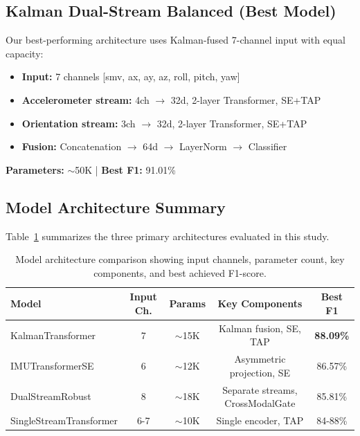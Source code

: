 \documentclass{article}
\begin{document}
\subsection{Kalman Dual-Stream Balanced (Best Model)}

Our best-performing architecture uses Kalman-fused 7-channel input with equal capacity:

\begin{itemize}
    \item \textbf{Input:} 7 channels [smv, ax, ay, az, roll, pitch, yaw]
    \item \textbf{Accelerometer stream:} 4ch $\rightarrow$ 32d, 2-layer Transformer, SE+TAP
    \item \textbf{Orientation stream:} 3ch $\rightarrow$ 32d, 2-layer Transformer, SE+TAP
    \item \textbf{Fusion:} Concatenation $\rightarrow$ 64d $\rightarrow$ LayerNorm $\rightarrow$ Classifier
\end{itemize}

\textbf{Parameters:} $\sim$50K | \textbf{Best F1:} 91.01\%

\subsection{Model Architecture Summary}

Table~\ref{tab:arch_comparison} summarizes the three primary architectures evaluated in this study.

\begin{table}[htbp]
    \centering
    \caption{Model architecture comparison showing input channels, parameter count, key components, and best achieved F1-score.}
    \label{tab:arch_comparison}
    \small
    \begin{tabular}{lcccc}
        \toprule
        \textbf{Model} & \textbf{Input Ch.} & \textbf{Params} & \textbf{Key Components} & \textbf{Best F1} \\
        \midrule
        KalmanTransformer & 7 & $\sim$15K & Kalman fusion, SE, TAP & \textbf{88.09\%} \\
        IMUTransformerSE & 6 & $\sim$12K & Asymmetric projection, SE & 86.57\% \\
        DualStreamRobust & 8 & $\sim$18K & Separate streams, CrossModalGate & 85.81\% \\
        SingleStreamTransformer & 6-7 & $\sim$10K & Single encoder, TAP & 84-88\% \\
        \bottomrule
    \end{tabular}
\end{table}
\end{document}
